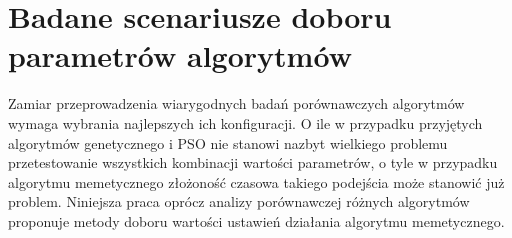 \section{Badane scenariusze doboru parametrów algorytmów}
\label{sec:badane_scenariusze_doboru_parametrow}
\par
Zamiar przeprowadzenia wiarygodnych badań porównawczych algorytmów wymaga wybrania najlepszych ich konfiguracji. O ile w przypadku przyjętych algorytmów genetycznego i PSO nie stanowi nazbyt wielkiego problemu przetestowanie wszystkich kombinacji wartości parametrów, o tyle w przypadku algorytmu memetycznego złożoność czasowa takiego podejścia może stanowić już problem. Niniejsza praca oprócz analizy porównawczej różnych algorytmów proponuje metody doboru wartości ustawień działania algorytmu memetycznego. 
